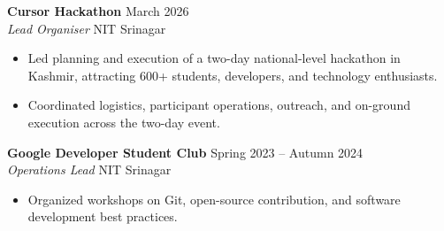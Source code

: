 \documentclass[letterpaper,10pt]{article}
\begin{document}
\textbf{Cursor Hackathon} \hfill March 2026\\
\textit{Lead Organiser} \hfill NIT Srinagar
\begin{itemize}
  \item Led planning and execution of a two-day national-level hackathon in Kashmir, attracting 600+ students, developers, and technology enthusiasts.
  \item Coordinated logistics, participant operations, outreach, and on-ground execution across the two-day event.
\end{itemize}

\textbf{Google Developer Student Club} \hfill Spring 2023 -- Autumn 2024\\
\textit{Operations Lead} \hfill NIT Srinagar
\begin{itemize}
  \item Organized workshops on Git, open-source contribution, and software development best practices.
\end{itemize}
\end{document}
